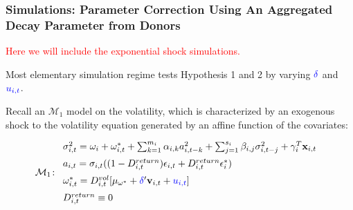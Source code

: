 \documentclass[9pt]{beamer}
\newcommand{\x}{\textbf{x}}
\def\mc#1{\mathcal{#1}} %
\def\mc#1{\mathcal{#1}}
\theoremstyle{definition}
\begin{document}
\begin{frame}
    \fontsize{8pt}{9pt}
    
    \frametitle{Simulations: Parameter Correction Using An Aggregated Decay Parameter from Donors}
    
    \textcolor{red}{Here we will include the exponential shock simulations.}
    
    Most elementary simulation regime tests Hypothesis 1 and 2 by varying $\textcolor{blue}{\delta}$ and $\textcolor{blue}{u_{i,t}}$.\\
    
    \bigbreak
    
    Recall an \hyperlink{model_1}{$\mc{M}_1$} model on the volatility, which is characterized by an exogenous shock to the volatility equation generated by an affine function of the covariates:
    
      \begin{align*}
        \mc{M}_1 \colon \begin{array}{l}
           \sigma^{2}_{i,t} = \omega_{i} + \omega^{*}_{i,t} + \sum^{m_{i}}_{k=1}\alpha_{i,k}a^{2}_{i,t-k} + \sum_{j=1}^{s_{i}}\beta_{i,j}\sigma_{i,t-j}^{2} + \gamma_{i}^{T} \x_{i,t} \text{ }\\[.2cm]
           a_{i,t} = \sigma_{i,t}((1-D^{return}_{i,t})\epsilon_{i,t} + D^{return}_{i,t}\epsilon^{*}_{i})\\[.2cm]
          \omega_{i,t}^{*} = D^{vol}_{i,t}[\mu_{\omega^{*}}+\textcolor{blue}{\delta}'\textbf{v}_{i, t}+ \textcolor{blue}{u_{i,t}}]\\[.2cm]
          D^{return}_{i,t} \equiv 0
        \end{array}
        \end{align*}
    



\end{frame}
\end{document}
